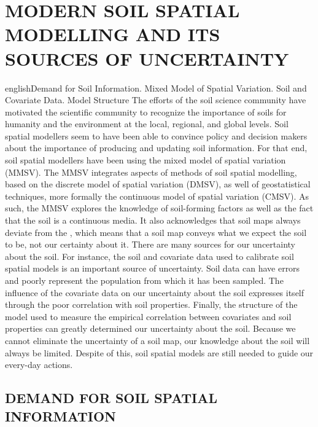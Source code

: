 \artigotrue
\chapter{MODERN SOIL SPATIAL MODELLING AND ITS SOURCES OF UNCERTAINTY}
\label{chap:chap02}

\def\enkeys{Demand for Soil Information. Mixed Model of Spatial Variation. Soil and Covariate Data. Model 
Structure}
  
\begin{chapterabstract}{english}{\enkeys}
The efforts of the soil science community have motivated the scientific community to recognize the importance 
of soils for humanity and the environment at the local, regional, and global levels. Soil spatial modellers 
seem to have been able to convince policy and decision makers about the importance of producing and updating 
soil information. For that end, soil spatial modellers have been using the mixed model of spatial variation 
(MMSV). The MMSV integrates aspects of  methods of soil spatial modelling, based on the discrete 
model of spatial variation (DMSV), as well of geostatistical techniques, more formally the continuous model of 
spatial variation (CMSV). As such, the MMSV explores the knowledge of soil-forming factors as well as the fact 
that the soil is a continuous media. It also acknowledges that soil maps always deviate from the , 
which means that a soil map conveys what we expect the soil to be, not our certainty about it. There are many 
sources for our uncertainty about the soil. For instance, the soil and covariate data used to calibrate soil 
spatial models is an important source of uncertainty. Soil data can have errors and poorly represent the 
population from which it has been sampled. The influence of the covariate data on our uncertainty about the 
soil expresses itself through the poor correlation with soil properties. Finally, the structure of the model 
used to measure the empirical correlation between covariates and soil properties can greatly determined our 
uncertainty about the soil. Because we cannot eliminate the uncertainty of a soil map, our knowledge about the 
soil will always be limited. Despite of this, soil spatial models are still needed to guide our every-day 
actions.
\end{chapterabstract}

\formatchapter

\section{DEMAND FOR SOIL SPATIAL INFORMATION}

